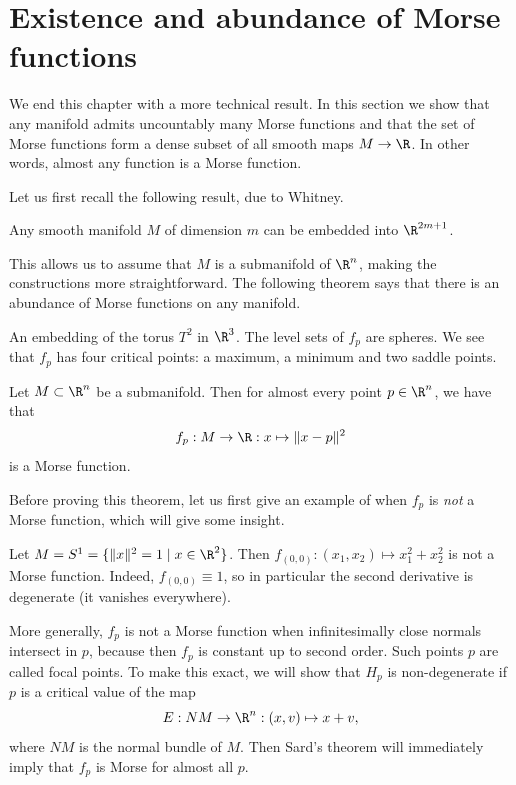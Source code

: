\section{Existence and abundance of Morse functions}
We end this chapter with a more technical result.
In this section we show that any manifold admits uncountably many Morse functions and that the set of Morse functions form a dense subset of all smooth maps $M \to  \R$.
In other words, almost any function is a Morse function.

Let us first recall the following result, due to Whitney.
\begin{theorem}
    Any smooth manifold $M$ of dimension $m$ can be embedded into  $\R^{2m+1}$.
\end{theorem}
This allows us to assume that $M$ is a submanifold of $\R^{n}$, making the constructions  more straightforward.
The following theorem says that there is an abundance of Morse functions on any manifold.
\begin{marginfigure}
    \centering
    \caption{An embedding of the torus $T^2$ in $\R^3$. The level sets of $f_p$ are spheres. We see that $f_p$ has four critical points: a maximum, a minimum and two saddle points.}
    \label{fig:level-sets-of-distance-function-torus}
\end{marginfigure}
\begin{prop}
    Let $M \subset \R^{n}$ be a submanifold.
    Then for almost every point $p \in \R^{n}$, we have that
    \[
    f_p : M \to \R: x \mapsto  \|x - p\|^2
    \] 
    is a Morse function.
\end{prop}


Before proving this theorem, let us first give an example of when $f_p$ is \emph{not} a Morse function, which will give some insight.

\begin{eg}
    Let $M = S^1 = \{\|x\|^2 = 1  \mid  x \in \R^2\} $.
    Then $f_{(0, 0)}:(x_1,x_2)\mapsto x_1^2 + x_2^2$ is not a Morse function.
    Indeed, $f_{(0, 0)} \equiv 1$, so in particular the second derivative is degenerate (it vanishes everywhere).
\end{eg}


More generally, $f_p$ is not a Morse function when infinitesimally close normals intersect in $p$, because then $f_p$ is constant up to second order.
Such points $p$ are called focal points.
To make this exact, we will show that $H_p$ is non-degenerate if $p$ is a critical value of the map
\[
    E: NM \to  \R^{n}: (x, v) \mapsto x + v
,\]
where $NM$ is the normal bundle of $M$.
Then Sard's theorem will immediately imply that $f_p$ is Morse for almost all $p$.

